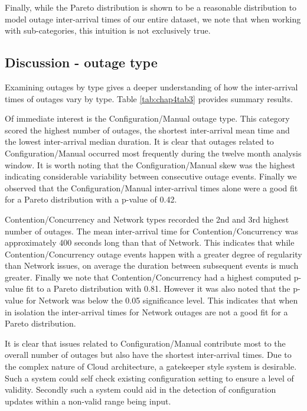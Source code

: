 Finally, while the Pareto distribution is shown to be a reasonable distribution to model outage inter-arrival times of our entire dataset, we note that when working with sub-categories, this intuition is not exclusively true.

\subsection{Discussion - outage type}

Examining outages by type gives a deeper understanding of how the inter-arrival times of outages vary by type. Table \ref{tab:chap4tab3} provides summary results. \par

Of immediate interest is the Configuration/Manual outage type. This category scored the highest number of outages, the shortest inter-arrival mean time and the lowest inter-arrival median duration. It is clear that outages related to Configuration/Manual occurred most frequently during the twelve month analysis window. It is worth noting that the Configuration/Manual skew was the highest indicating considerable variability between consecutive outage events. Finally we observed that the Configuration/Manual inter-arrival times alone were a good fit for a Pareto distribution with a p-value of 0.42.

Contention/Concurrency and Network types recorded the 2nd and 3rd highest number of outages. The mean inter-arrival time for Contention/Concurrency was approximately 400 seconds long than that of Network. This indicates that while Contention/Concurrency outage events happen with a greater degree of regularity than Network issues, on average the duration between subsequent events is much greater. Finally we note that Contention/Concurrency had a highest computed p-value fit to a Pareto distribution with 0.81. However it was also noted that the p-value for Network was below the 0.05 significance level. This indicates that when in isolation the inter-arrival times for Network outages are not a good fit for a Pareto distribution. 

It is clear that issues related to Configuration/Manual contribute most to the overall number of outages but also have the shortest inter-arrival times. Due to the complex nature of Cloud architecture, a gatekeeper style system is desirable. Such a system could self check existing configuration setting to ensure a level of validity. Secondly such a system could aid in the detection of configuration updates within a non-valid range being input.

